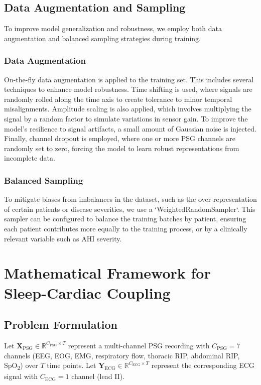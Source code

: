 \documentclass[11pt,en]{elegantpaper}
\begin{document}
\subsection{Data Augmentation and Sampling}
To improve model generalization and robustness, we employ both data augmentation and balanced sampling strategies during training.

\subsubsection{Data Augmentation}
On-the-fly data augmentation is applied to the training set. This includes several techniques to enhance model robustness. Time shifting is used, where signals are randomly rolled along the time axis to create tolerance to minor temporal misalignments. Amplitude scaling is also applied, which involves multiplying the signal by a random factor to simulate variations in sensor gain. To improve the model's resilience to signal artifacts, a small amount of Gaussian noise is injected. Finally, channel dropout is employed, where one or more PSG channels are randomly set to zero, forcing the model to learn robust representations from incomplete data.

\subsubsection{Balanced Sampling}
To mitigate biases from imbalances in the dataset, such as the over-representation of certain patients or disease severities, we use a `WeightedRandomSampler`. This sampler can be configured to balance the training batches by patient, ensuring each patient contributes more equally to the training process, or by a clinically relevant variable such as AHI severity.

\section{Mathematical Framework for Sleep-Cardiac Coupling}

\subsection{Problem Formulation}

Let $\mathbf{X}_{\text{PSG}} \in \mathbb{R}^{C_{\text{PSG}} \times T}$ represent a multi-channel PSG recording with $C_{\text{PSG}} = 7$ channels (EEG, EOG, EMG, respiratory flow, thoracic RIP, abdominal RIP, SpO\textsubscript{2}) over $T$ time points. Let $\mathbf{Y}_{\text{ECG}} \in \mathbb{R}^{C_{\text{ECG}} \times T}$ represent the corresponding ECG signal with $C_{\text{ECG}} = 1$ channel (lead II).
\end{document}
